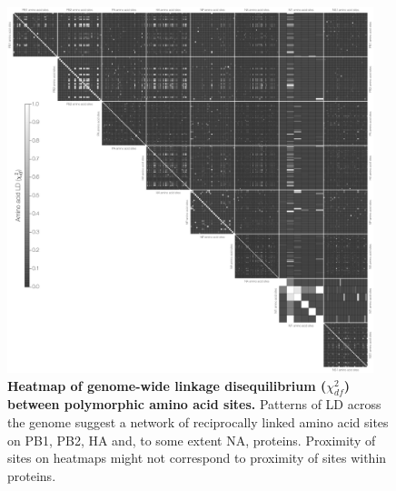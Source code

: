 \documentclass[11pt,oneside,letterpaper]{article}
\newcommand{\chiSq}{\chi^{2}_{df}}
\begin{document}
\begin{figure}
\centering  
\includegraphics[width=0.95\textwidth]  {supp_figures/aaChi_Genome.png}
\caption{\textbf{Heatmap of genome-wide linkage disequilibrium ($\chiSq$) between polymorphic amino acid sites.}
Patterns of LD across the genome suggest a network of reciprocally linked amino acid sites on PB1, PB2, HA and, to some extent NA, proteins.
Proximity of sites on heatmaps might not correspond to proximity of sites within proteins.}
\label{ChiGenome}
\end{figure}
\end{document}
